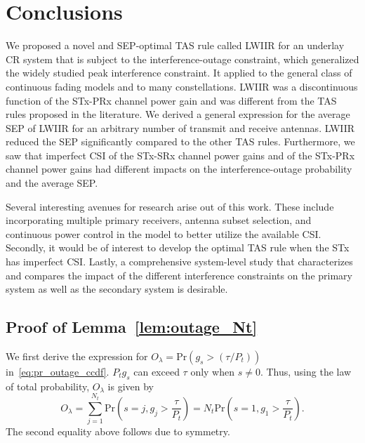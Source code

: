 \documentclass[journal]{IEEEtran}
\newcommand{\brac}[1]{\left({#1}\right)}
\newcommand{\prob}[1]{\text{Pr}\brac{#1}}
\newcommand{\lam}{\lambda}
\newcommand{\Nt}{{N_t}}
\newcommand{\Pt}{{P_t}}
\newcommand{\puch}{g}
\newcommand{\gk}[1]{{\puch_{#1}}}
\newcommand{\itau}{\tau}
\newcommand{\out}{O}
\newcommand{\taubypt}{\frac{\itau}{\Pt}}
\newcommand{\taubyptinl}{{\itau}/{\Pt}}
\newcommand{\gkgrtaubypt}[1]{{\gk{#1}}>\taubypt}
\newcommand{\gkgrtaubyptinl}[1]{{\gk{#1}}>\left( \taubyptinl \right) }
\newcommand{\outlam}{\out_{\lam}}
\newcommand{\eqidx}{j}
\begin{document}
\section{Conclusions}
\label{sec:conclusions}
We proposed a novel and SEP-optimal TAS rule called LWIIR for an underlay CR system that is subject to the interference-outage constraint, which generalized the widely studied peak interference constraint. It applied to the general class of continuous fading models and to many constellations. LWIIR was a discontinuous function of the STx-PRx channel power gain and was different from the TAS rules proposed in the literature. We derived a general expression for the average SEP of LWIIR for an arbitrary number of transmit and receive antennas. LWIIR reduced the SEP significantly  compared to the other TAS rules. Furthermore, we saw that imperfect CSI of the STx-SRx channel power gains and of the STx-PRx channel power gains had different impacts on the interference-outage probability and the average SEP. 

Several interesting avenues for research arise out of this work.  These include incorporating multiple primary receivers, antenna subset selection, and continuous power control in the model to better utilize the available CSI. Secondly, it would be of interest to develop the optimal TAS rule when the STx has imperfect CSI. Lastly, a comprehensive  system-level study that characterizes  and compares the impact of the  different interference constraints on the primary system as well as  the secondary system is desirable.



\appendix
\subsection{Proof of Lemma~\ref{lem:outage_Nt}}
\label{proof:outage_Nt}
We first derive the expression for $\outlam = \prob{\gkgrtaubyptinl{s}}$ in~\eqref{eq:pr_outage_ccdf}. $\Pt \gk{s}$ can exceed  $\itau$ only when $s\neq0$. Thus, using the law of total probability, $\outlam$ is given by
%
\begin{equation}
\outlam =  \sum_{\eqidx=1}^{\Nt}\text{Pr}\brac{s=\eqidx,\gkgrtaubypt{\eqidx}}
=\Nt\text{Pr}\brac{s=1,\gkgrtaubypt{1}}.
\label{eq:out_1}
\end{equation}
%
The second equality above follows due to symmetry.
\end{document}
